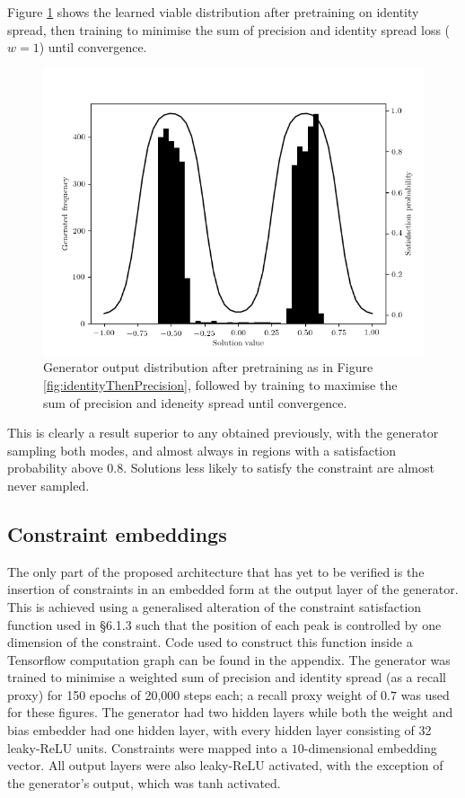 \documentclass[../../main.tex]{subfiles}
\begin{document}
Figure \ref{fig:identityAndPrecision} shows the learned viable distribution after pretraining on identity spread, then training to minimise the sum of precision and identity spread loss ($w=1$) until convergence.
\begin{figure}[H]
    \begin{center}
    \includegraphics[width=\textwidth]{identityAndPrecision}
    \caption{
        Generator output distribution after pretraining as in Figure \ref{fig:identityThenPrecision}, followed by training to maximise the sum of precision and ideneity spread until convergence.
    }
    \label{fig:identityAndPrecision}
    \end{center}
\end{figure}
This is clearly a result superior to any obtained previously, with the generator sampling both modes, and almost always in regions with a satisfaction probability above $0.8$.
Solutions less likely to satisfy the constraint are almost never sampled.

\subsection{Constraint embeddings}

The only part of the proposed architecture that has yet to be verified is the insertion of constraints in an embedded form at the output layer of the generator.
This is achieved using a generalised alteration of the constraint satisfaction function used in \S6.1.3 such that the position of each peak is controlled by one dimension of the constraint.
Code used to construct this function inside a Tensorflow computation graph can be found in the appendix.
The generator was trained to minimise a weighted sum of precision and identity spread (as a recall proxy) for 150 epochs of 20,000 steps each; a recall proxy weight of $0.7$ was used for these figures.
The generator had two hidden layers while both the weight and bias embedder had one hidden layer, with every hidden layer consisting of 32 leaky-ReLU units.
Constraints were mapped into a $10$-dimensional embedding vector.
All output layers were also leaky-ReLU activated, with the exception of the generator's output, which was tanh activated.
\end{document}
